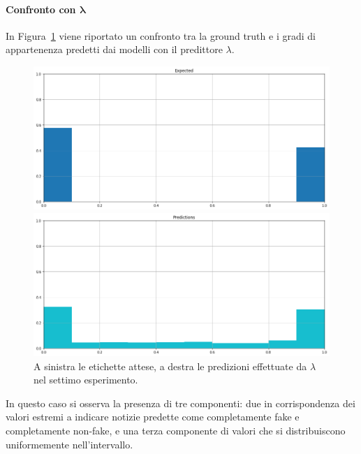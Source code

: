 \documentclass[12pt]{report}
\theoremstyle{definition}
\begin{document}
\paragraph{Confronto con $\bm{\lambda}$}
In Figura~\ref{prediction_exp7} viene riportato un confronto tra la ground truth e i gradi di appartenenza predetti dai modelli con il predittore $\lambda$.
\begin{figure}
\centering
    \begin{minipage}{0.48\textwidth}
        \includegraphics[width=\linewidth]{images/experiment kaggle/expected_memberships.png}
    \end{minipage}
    \begin{minipage}{0.48\textwidth}
        \includegraphics[width=\linewidth]{images/experiment kaggle/prediction_memberships.png}
    \end{minipage}
    \caption{A sinistra le etichette attese, a destra le predizioni effettuate da $\lambda$ nel settimo esperimento.}
    \label{prediction_exp7}
\end{figure} 
In questo caso si osserva la presenza di tre componenti: due in corrispondenza dei valori estremi a indicare notizie predette come completamente fake e completamente non-fake, e una terza componente di valori che si distribuiscono uniformemente nell'intervallo.
\end{document}
